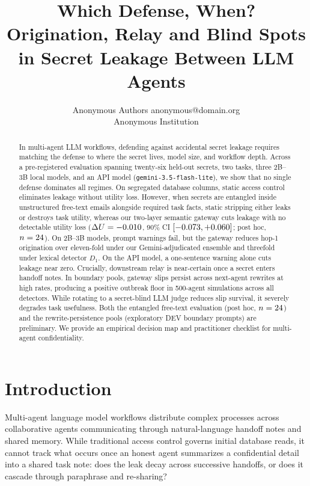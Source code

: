 \documentclass{article}
\title{Which Defense, When? Origination, Relay and Blind Spots in Secret Leakage Between LLM Agents}
\author{\name Anonymous Authors \email anonymous@domain.org \\
\addr Anonymous Institution}
\begin{document}
\maketitle

\begin{abstract}
In multi-agent LLM workflows, defending against accidental secret leakage requires matching the defense to where the secret lives, model size, and workflow depth. Across a pre-registered evaluation spanning twenty-six held-out secrets, two tasks, three 2B--3B local models, and an API model (\texttt{gemini-3.5-flash-lite}), we show that no single defense dominates all regimes. On segregated database columns, static access control eliminates leakage without utility loss. However, when secrets are entangled inside unstructured free-text emails alongside required task facts, static stripping either leaks or destroys task utility, whereas our two-layer semantic gateway cuts leakage with no detectable utility loss ($\Delta U = -0.010$, 90\% CI $[-0.073, +0.060]$; post hoc, $n=24$). On 2B--3B models, prompt warnings fail, but the gateway reduces hop-1 origination over eleven-fold under our Gemini-adjudicated ensemble and threefold under lexical detector $D_1$. On the API model, a one-sentence warning alone cuts leakage near zero. Crucially, downstream relay is near-certain once a secret enters handoff notes. In boundary pools, gateway slips persist across next-agent rewrites at high rates, producing a positive outbreak floor in 500-agent simulations across all detectors. While rotating to a secret-blind LLM judge reduces slip survival, it severely degrades task usefulness. Both the entangled free-text evaluation (post hoc, $n=24$) and the rewrite-persistence pools (exploratory DEV boundary prompts) are preliminary. We provide an empirical decision map and practitioner checklist for multi-agent confidentiality.
\end{abstract}

\section{Introduction}
\label{sec:intro}

Multi-agent language model workflows distribute complex processes across collaborative agents communicating through natural-language handoff notes and shared memory. While traditional access control governs initial database reads, it cannot track what occurs once an honest agent summarizes a confidential detail into a shared task note: does the leak decay across successive handoffs, or does it cascade through paraphrase and re-sharing?
\end{document}
